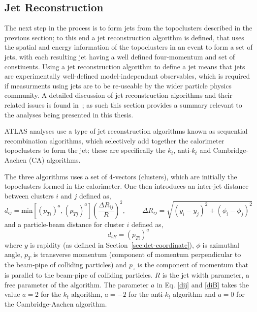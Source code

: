 \FloatBarrier
\subsection{Jet Reconstruction}
\label{sec:obj-jet_reco}

The next step in the process is to form jets from the topoclusters described in the previous section;
to this end a jet reconstruction algorithm is defined, that uses the spatial and energy information of the topoclusters in an event
to form a set of jets, with each resulting jet having a well defined four-momentum and set of constiuents.
Using a jet reconstruction algorithm to define a jet means that jets are experimentally well-defined model-independant observables,
which is required if measurments using jets are to be re-useable by the wider particle physics community.
A detailed discussion of jet reconstruction algorithms
and their related issues is found in~\cite{obj-jet_reco_salam};
as such this section provides a summary relevant to the analyses being presented in this thesis.

ATLAS analyses use a type of jet reconstruction algorithms known as sequential recombination algorithms,
which selectively add together the calorimeter topoclusters to form the jet;
these are specifically the $k_t$, anti-$k_t$ and Cambridge-Aachen (CA) algorithms.

The three algorithms uses a set of 4-vectors (clusters), which are initially the topoclusters formed in the calorimeter.
One then introduces an inter-jet distance between clusters $i$ and $j$ defined as,
\begin{equation}
  d_{ij} = \text{min}
  [(p_{ Ti})^a, (p_{ Tj})^a]  \left(\frac{\Delta  R_{ij}}{R}\right) ^2, \hspace{1cm} \Delta R_{ij} = \sqrt{(y_{i} - y_{j})^2 + (\phi_{i} - \phi_{j})^2} \label{dij}
\end{equation}
\noindent and a particle-beam distance for cluster $i$ defined as,
\begin{equation}
  d_{iB} = (p_{Ti})^a \label{diB}
\end{equation}
where $y$  is rapidity (as defined in Section~\ref{sec:det-coordinate}), $\phi$ is azimuthal angle,
$p_T$ is transverse momentum (component of momentum perpendicular to the beam-pipe of colliding particles)
and $p_z$ is the component of momentum that is parallel to the beam-pipe of colliding particles.
$R$ is the jet width parameter, a free parameter of the algorithm.
The parameter $a$ in Eq. \eqref{dij} and \eqref{diB} takes the value $a = 2$ for the $k_t$ algorithm, $a = -2$ for the anti-$k_t$ algorithm 
and  $a = 0$ for the Cambridge-Aachen algorithm.

